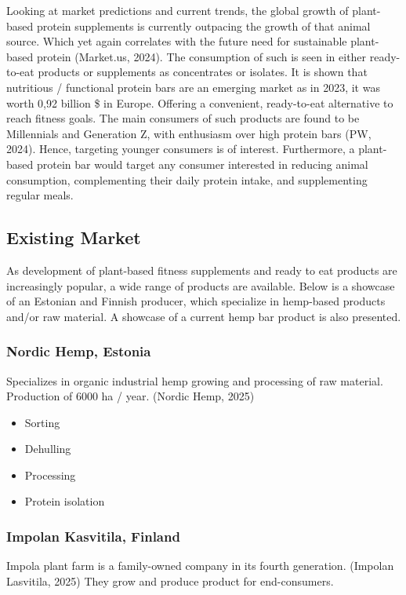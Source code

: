 \vspace{1em}
Looking at market predictions and current trends, the global growth of plant-based protein supplements is currently outpacing the growth of that animal source. Which yet again correlates with the future need for sustainable plant-based protein (Market.us, 2024). The consumption of such is seen in either ready-to-eat products or supplements as concentrates or isolates. It is shown that nutritious / functional protein bars are an emerging market as in 2023, it was worth 0,92 billion \$ in Europe. Offering a convenient, ready-to-eat alternative to reach fitness goals. The main consumers of such products are found to be Millennials and Generation Z, with enthusiasm over high protein bars (PW, 2024). Hence, targeting younger consumers is of interest. Furthermore, a plant-based protein bar would target any consumer interested in reducing animal consumption, complementing their daily protein intake, and supplementing regular meals.

\subsection{Existing Market}
As development of plant-based fitness supplements and ready to eat products are increasingly popular, a wide range of products are available. Below is a showcase of an Estonian and Finnish producer, which specialize in hemp-based products and/or raw material. A showcase of a current hemp bar product is also presented.

\subsubsection*{Nordic Hemp, Estonia}
Specializes in organic industrial hemp growing and processing of raw material. Production of 6000 ha / year. (Nordic Hemp, 2025)
\begin{itemize}
    \item Sorting
    \item Dehulling
    \item Processing
    \item Protein isolation
\end{itemize}

\subsubsection*{Impolan Kasvitila, Finland}
Impola plant farm is a family-owned company in its fourth generation. (Impolan Lasvitila, 2025)
They grow and produce product for end-consumers. 


